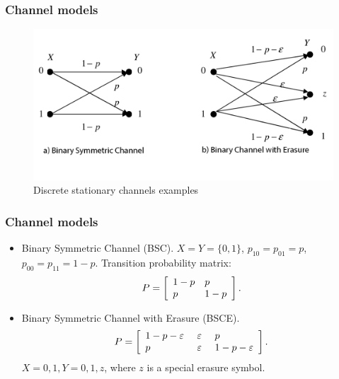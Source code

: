 \documentclass[14pt]{beamer}
\begin{document}
\begin{frame}
\frametitle{Channel models}
\begin{itemize}

\begin{figure}[ht]
\begin{minipage}{1.0\linewidth}
\includegraphics[width=1.0\textwidth]{fig5_2.png}
\caption{Discrete stationary channels examples} \label{fig5_2}
\end{minipage}
\end{figure}

\end{itemize}
\end{frame}

\begin{frame}
\frametitle{Channel models}
\begin{itemize}
    \item Binary Symmetric Channel (BSC).
        $X = Y = \{0,1\}$,
        $p_{10} = p_{01} = p$, $p_{00} = p_{11} = 1 - p$. 
        Transition probability matrix: 
        \[
        P = \left[ {{\begin{array}{*{20}c}
         {1 - p} \hfill & p \hfill \\
         p \hfill & {1 - p} \hfill \\
        \end{array} }} \right].
        \]

    \pause \item
    Binary Symmetric Channel with Erasure (BSCE). 
    \[
    P = \left[ {{\begin{array}{*{20}c}
     {1 - p - \varepsilon } \hfill \\
     p \hfill \\
    \end{array} }\mbox{ }{\begin{array}{*{20}c}
     \varepsilon \hfill \\
     \varepsilon \hfill \\
    \end{array} }\mbox{ }{\begin{array}{*{20}c}
     p \hfill \\
     {1 - p - \varepsilon } \hfill \\
    \end{array} }} \right].
    \]
    $X = {0,1}, Y = {0, 1, z}$, where $z$ is a special erasure symbol.    
    
\end{itemize}
\end{frame}
\end{document}
